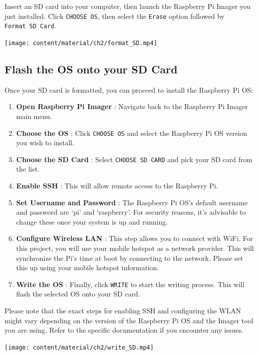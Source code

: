 \documentclass[
  letterpaper,
]{scrbook}
\providecommand{\tightlist}{%
  \setlength{\itemsep}{0pt}\setlength{\parskip}{0pt}}\usepackage{longtable,booktabs,array}
\begin{document}
Insert an SD card into your computer, then launch the Raspberry Pi
Imager you just installed. Click \texttt{CHOOSE\ OS}, then select the
\texttt{Erase} option followed by \texttt{Format\ SD\ Card}.

\texttt{[image: content/material/ch2/format\_SD.mp4]}

\subsection{Flash the OS onto your SD
Card}\label{flash-the-os-onto-your-sd-card}

Once your SD card is formatted, you can proceed to install the Raspberry
Pi OS:

\begin{enumerate}
\def\labelenumi{\arabic{enumi}.}
\tightlist
\item
  \textbf{Open Raspberry Pi Imager} : Navigate back to the Raspberry Pi
  Imager main menu.
\item
  \textbf{Choose the OS} : Click \texttt{CHOOSE\ OS} and select the
  Raspberry Pi OS version you wish to install.
\item
  \textbf{Choose the SD Card} : Select \texttt{CHOOSE\ SD\ CARD} and
  pick your SD card from the list.
\item
  \textbf{Enable SSH} : This will allow remote access to the Raspberry
  Pi.
\item
  \textbf{Set Username and Password} : The Raspberry Pi OS's default
  username and password are `pi' and `raspberry'. For security reasons,
  it's advisable to change these once your system is up and running.
\item
  \textbf{Configure Wireless LAN} : This step allows you to connect with
  WiFi. For this project, you will use your mobile hotspot as a network
  provider. This will synchronize the Pi's time at boot by connecting to
  the network. Please set this up using your mobile hotspot information.
\item
  \textbf{Write the OS} : Finally, click \texttt{WRITE} to start the
  writing process. This will flash the selected OS onto your SD card.
\end{enumerate}

Please note that the exact steps for enabling SSH and configuring the
WLAN might vary depending on the version of the Raspberry Pi OS and the
Imager tool you are using. Refer to the specific documentation if you
encounter any issues.

\texttt{[image: content/material/ch2/write\_SD.mp4]}
\end{document}
